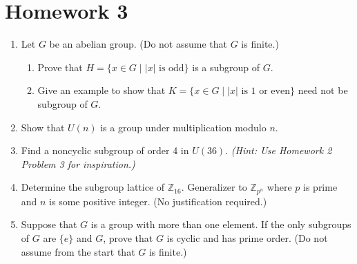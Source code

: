 \documentclass{article}
\newcommand{\ZZ}{\mathbb{Z}}
\newcommand{\lr}[1]{\langle #1 \rangle}
\begin{document}
\section*{Homework 3}
\begin{enumerate}

    \item Let $G$ be an abelian group. (Do not assume that $G$ is finite.)
    \begin{enumerate}
        \item Prove that $H=\{x\in G\mid|x|\text{ is odd}\}$ is a subgroup of $G$. 
        \item Give an example to show that $K=\{x\in G\mid|x|\text{ is 1 or even}\}$ need not be subgroup of $G$. 
    \end{enumerate} 

    
    \item Show that $U(n)$ is a group under multiplication modulo $n$. 
    
    
    \item Find a noncyclic subgroup of order 4 in $U(36)$. \textit{(Hint: Use Homework 2 Problem 3 for inspiration.)}
    

    \item Determine the subgroup lattice of $\ZZ_{16}$. Generalizer to $\ZZ_{p^n}$ where $p$ is prime and $n$ is some positive integer. (No justification required.)
    


    \item Suppose that $G$ is a group with more than one element. If the only subgroups of $G$ are $\{e\}$ and $G$, prove that $G$ is cyclic and has prime order. (Do not assume from the start that $G$ is finite.)
    
\end{enumerate}

  
\end{document}
